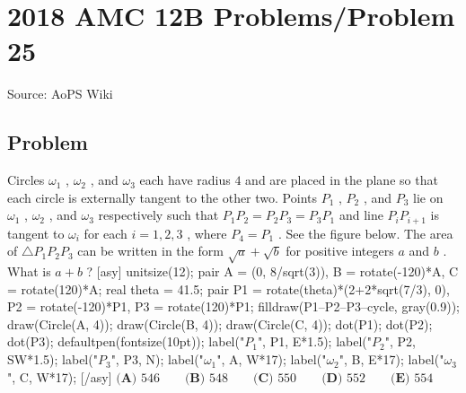 \documentclass[12pt]{article}
\begin{document}
\section*{{2018 AMC 12B Problems/Problem 25}}
Source: AoPS Wiki

\subsection*{Problem}
Circles $\omega_1$ , $\omega_2$ , and $\omega_3$ each have radius $4$ and are placed in the plane so that each circle is externally tangent to the other two. Points $P_1$ , $P_2$ , and $P_3$ lie on $\omega_1$ , $\omega_2$ , and $\omega_3$ respectively such that $P_1P_2=P_2P_3=P_3P_1$ and line $P_iP_{i+1}$ is tangent to $\omega_i$ for each $i=1,2,3$ , where $P_4 = P_1$ . See the figure below. The area of $\triangle P_1P_2P_3$ can be written in the form $\sqrt{a}+\sqrt{b}$ for positive integers $a$ and $b$ . What is $a+b$ ? [asy] unitsize(12); pair A = (0, 8/sqrt(3)), B = rotate(-120)*A, C = rotate(120)*A; real theta = 41.5; pair P1 = rotate(theta)*(2+2*sqrt(7/3), 0), P2 = rotate(-120)*P1, P3 = rotate(120)*P1; filldraw(P1--P2--P3--cycle, gray(0.9)); draw(Circle(A, 4)); draw(Circle(B, 4)); draw(Circle(C, 4)); dot(P1); dot(P2); dot(P3); defaultpen(fontsize(10pt)); label("$P_1$", P1, E*1.5); label("$P_2$", P2, SW*1.5); label("$P_3$", P3, N); label("$\omega_1$", A, W*17); label("$\omega_2$", B, E*17); label("$\omega_3$", C, W*17); [/asy] $\textbf{(A) }546\qquad\textbf{(B) }548\qquad\textbf{(C) }550\qquad\textbf{(D) }552\qquad\textbf{(E) }554$
\end{document}
